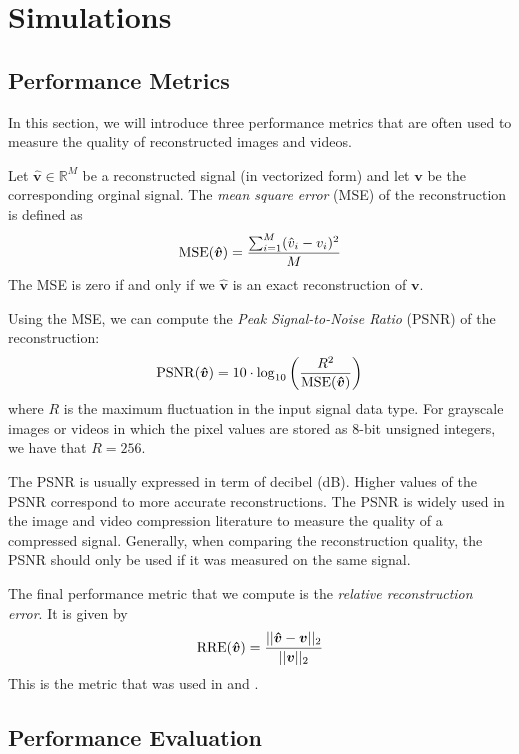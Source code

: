 \chapter{Simulations}
\label{ch:results}

\section{Performance Metrics}
In this section, we will introduce three performance metrics that are often used to measure the quality of reconstructed images and videos.

Let $\bm \hat{v} \in\mathbb{R}^M$ be a reconstructed signal (in vectorized form) and let $\bm v$ be the corresponding orginal signal.
The \emph{mean square error} (MSE) of the reconstruction is defined as
\begin{equation*}
  \operatorname*{MSE}(\bm{\hat v}) = \frac{\sum_{i=1}^M (\hat v_i - v_i)^2}{M}
\end{equation*}
The MSE is zero if and only if we $\bm{\hat v}$ is an exact reconstruction of $\bm v$.

Using the MSE, we can compute the \emph{Peak Signal-to-Noise Ratio} (PSNR) of the reconstruction:
\begin{equation*}
  \operatorname*{PSNR}(\bm{\hat v}) = 10 \cdot \log_{10} \left(\frac{R^2}{\operatorname*{MSE}(\bm{\hat v})}\right)
\end{equation*}
where $R$ is the maximum fluctuation in the input signal data type. 
For grayscale images or videos in which the pixel values are stored as 8-bit unsigned integers, we have that $R = 256$.

The PSNR is usually expressed in term of decibel (dB). 
Higher values of the PSNR correspond to more accurate reconstructions.
The PSNR is widely used in the image and video compression literature to measure the quality of a compressed signal.
Generally, when comparing the reconstruction quality, the PSNR should only be used if it was measured on the same signal.

The final performance metric that we compute is the \emph{relative reconstruction error}.
It is given by
\begin{equation*}
  \operatorname*{RRE}(\bm{\hat v}) = \frac{||\bm{\hat v} - \bm v||_2}{||\bm v||_2}
\end{equation*}
This is the metric that was used in \cite{ji2008} and \cite{pilikos2014}.


\section{Performance Evaluation}



